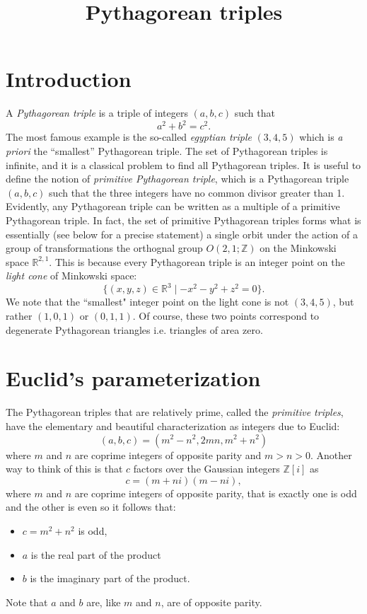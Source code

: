 \documentclass[12pt,a4paper]{amsart}
\title{Pythagorean triples}
\def\ZZ{\mathbb{Z}}
\begin{document}
\maketitle

\section{Introduction}

A \textit{Pythagorean triple} is a triple of integers $(a,b,c)$ such
that $$a^2 + b^2 = c^2.$$
The most famous example is the so-called \textit{egyptian triple}
$(3,4,5)$ which is \textit{a priori} the ``smallest'' Pythagorean triple.	
The set of Pythagorean triples is infinite, and it is a classical problem to find all Pythagorean triples. 
It is useful to define the notion of \textit{primitive Pythagorean
triple}, which is a Pythagorean triple $(a,b,c)$ such that
the three integers have no common divisor greater than 1.
Evidently, any Pythagorean triple can be written as a multiple of a primitive Pythagorean triple.
In fact, the set of primitive Pythagorean triples 
forms what is
essentially (see below for a precise statement) a single orbit under the action of a group of transformations the orthognal group $O(2,1;\ZZ)$ on the Minkowski space $\mathbb{R}^{2,1}$.
This is because every Pythagorean triple is an integer point on the
\textit{light cone} of Minkowski space: 
$$ \{ (x,y,z) \in \mathbb{R}^3 \mid -x^2 - y^2 + z^2 = 0 \}.$$
We note that the ``smallest" integer point on the light cone is not
$(3,4,5)$, but rather $(1,0,1)$ or $(0,1,1)$.
Of course, these two points correspond to degenerate Pythagorean triangles i.e. triangles of area zero.

\section{Euclid's parameterization}


The Pythagorean triples that are relatively prime, called the
\textit{primitive triples}, have
the elementary and beautiful characterization as integers
due to Euclid:
$$(a,b,c) = (m^2 - n^2, 2mn, m^2 + n^2)$$
where $m$ and $n$ are coprime integers of opposite parity and $m > n > 0$.
Another way to think of this is
that $c$ factors over the Gaussian integers $\mathbb{Z}[i]$ 
as 
$$c = (m+ni)(m-ni),$$ 
where $m$ and $n$ are coprime integers of opposite parity,
that is exactly one is odd and the other is even
so it follows that:
\begin{itemize}
	\item $c= m^2 + n^2$ is odd,
	\item $a$ is the real part of the product 
	\item $b$ is the imaginary part of the product.
\end{itemize}
Note that $a$ and $b$ are, like $m$ and $n$, are of opposite parity.
\end{document}
